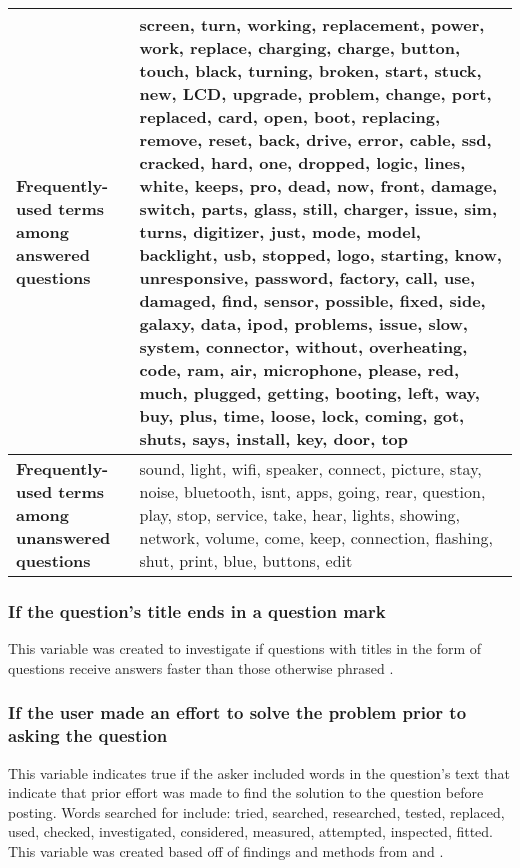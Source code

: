 \documentclass[]{interact}\usepackage[]{graphicx}\usepackage[]{color}
\begin{document}
{%
\begin{table}[!htbp]
{}
{\begin{tabular}{|L{4cm}|L{8cm}|}
  \hline
 \textbf{Frequently-used terms among answered questions} & screen, turn, working, replacement, power, work, replace, charging, charge, button, touch, black, turning, broken, start, stuck, new, LCD, upgrade, problem, change, port, replaced, card, open, boot, replacing, remove, reset, back, drive, error, cable, ssd, cracked, hard, one, dropped, logic, lines, white, keeps, pro, dead, now, front, damage, switch, parts, glass, still, charger, issue, sim, turns, digitizer, just, mode, model, backlight, usb, stopped, logo, starting, know, unresponsive, password, factory, call, use, damaged, find, sensor, possible, fixed, side, galaxy, data, ipod, problems, issue, slow, system, connector, without, overheating, code, ram, air, microphone, please, red, much, plugged, getting, booting, left, way, buy, plus, time, loose, lock, coming, got, shuts, says, install, key, door, top \\
  \hline
  \textbf{Frequently-used terms among unanswered questions} & sound, light, wifi, speaker, connect, picture, stay, noise, bluetooth, isnt, apps, going, rear, question, play, stop, service, take, hear, lights, showing, network, volume, come, keep, connection, flashing, shut, print, blue, buttons, edit \\ 
   \hline
\end{tabular}}
\label{table:6}
\end{table}


\subsubsection{If the question's title ends in a question mark}

This variable was created to investigate if questions with titles in the form of questions receive answers faster than those otherwise phrased \citep{Bhat2014}. 


\subsubsection{If the user made an effort to solve the problem prior to asking the question}

This variable indicates true if the asker included words in the question's text that indicate that prior effort was made to find the solution to the question before posting. Words searched for include: tried, searched, researched, tested, replaced, used, checked, investigated, considered, measured, attempted, inspected, fitted. This variable was created based off of findings and methods from \citet{Bhat2014} and \citet{Harper2008}. 


}
\end{document}
